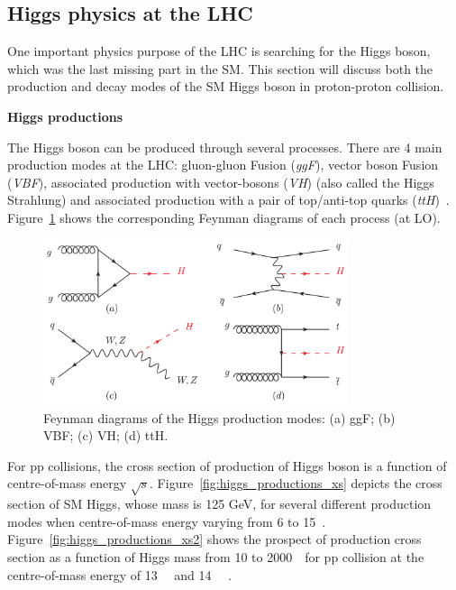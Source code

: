 \subsection{Higgs physics at the LHC}
\label{higgs}

One important physics purpose of the LHC is searching for the Higgs boson, which was the last missing part in the SM.
This section will discuss both the production and decay modes of the SM Higgs boson in proton-proton collision.

\textbf{Higgs productions}

The Higgs boson can be produced through several processes.
There are 4 main production modes at the LHC: gluon-gluon Fusion (\textit{ggF}), vector boson Fusion (\textit{VBF}),
associated production with vector-bosons (\textit{VH}) (also called the Higgs Strahlung) 
and associated production with a pair of top/anti-top quarks (\textit{ttH})~\cite{Grojean:2243593}.
Figure~\ref{fig:higgs_productions_fd} shows the corresponding Feynman diagrams of each process (at LO).
\begin{figure}[!htb]
  \centering
  \includegraphics[width=0.8\textwidth]{figures/Theory/Figures_FeynmanHprod.png}
  \caption{Feynman diagrams of the Higgs production modes:
	   (a) ggF; (b) VBF; (c) VH; (d) ttH.}
  \label{fig:higgs_productions_fd}
\end{figure}
For pp collisions, the cross section of production of Higgs boson is a function of centre-of-mass energy $\sqrt{s}$. 
Figure~\ref{fig:higgs_productions_xs} depicts the cross section of SM Higgs, whose mass is 125 GeV, for several different production modes when centre-of-mass energy varying from 6 to 15~\tev.
Figure~\ref{fig:higgs_productions_xs2} shows the prospect of production cross section  
as a function of Higgs mass from 10 to 2000~\gev~for pp collision at the centre-of-mass energy of 13~\tev~ and 14~\tev~ \cite{deFlorian:2227475}. 

